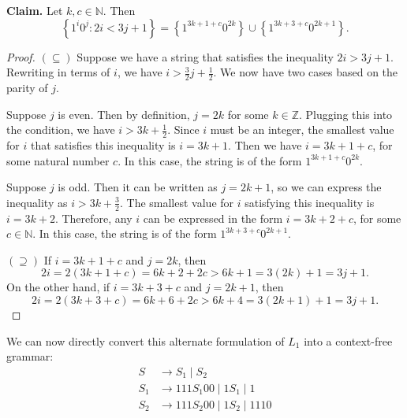\documentclass{article}
\begin{document}
    \vspace{2mm}
    \textbf{Claim. } Let $k, c \in \mathbb{N}$. Then $$\left\{1^{i}0^{j} : 2i < 3j + 1\right\} = \left\{1^{3k + 1 + c}0^{2k}\right\} \cup \left\{1^{3k + 3 + c}0^{2k + 1}\right\}.$$
    \begin{proof}
        $(\subseteq)$ Suppose we have a string that satisfies the inequality $2i > 3j + 1$. Rewriting in terms of $i$, we have $i > \frac{3}{2}j + \frac{1}{2}$. We now have two cases based on the parity of $j$.
        
        \begin{Cases}
            \item Suppose $j$ is even. Then by definition, $j = 2k$ for some $k \in \mathbb{Z}$. Plugging this into the condition, we have $i > 3k + \frac{1}{2}$. Since $i$ must be an integer, the smallest value for $i$ that satisfies this inequality is $i = 3k + 1$. Then we have $i = 3k + 1 + c$, for some natural number $c$. In this case, the string is of the form $1^{3k + 1 + c}0^{2k}$.
            \item Suppose $j$ is odd. Then it can be written as $j = 2k + 1$, so we can express the inequality as $i > 3k + \frac{3}{2}$. The smallest value for $i$ satisfying this inequality is $i = 3k + 2$. Therefore, any $i$ can be expressed in the form $i = 3k + 2 + c$, for some $c \in \mathbb{N}$. In this case, the string is of the form $1^{3k + 3 + c}0^{2k + 1}$.
        \end{Cases}
        $(\supseteq)$ If $i = 3k + 1 + c$ and $j = 2k$, then $$2i = 2(3k + 1 + c) = 6k + 2 + 2c > 6k + 1 = 3(2k) + 1 = 3j + 1.$$ On the other hand, if $i = 3k + 3 + c$ and $j = 2k + 1$, then $$2i = 2(3k + 3 + c) = 6k + 6 + 2c > 6k + 4 = 3(2k + 1) + 1 = 3j + 1.$$
    \end{proof}
    We can now directly convert this alternate formulation of $L_{1}$ into a context-free grammar: 
    \begin{align*}
        S &\rightarrow S_{1} \mid S_{2} \\
        S_{1} &\rightarrow 111S_{1}00 \mid 1S_{1} \mid 1 \\
        S_{2} &\rightarrow 111S_{2}00 \mid 1S_{2} \mid 1110
    \end{align*}
\end{document}

